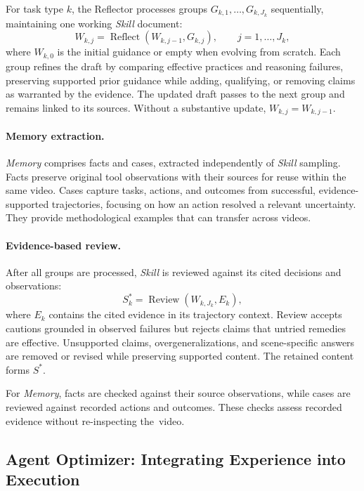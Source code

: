 \documentclass{article} %
\begin{document}
For task type $k$, the Reflector processes groups $G_{k,1},\ldots,G_{k,J_k}$ sequentially, maintaining one working \textit{Skill} document:
\begin{equation}
W_{k,j}=\operatorname{Reflect}(W_{k,j-1},G_{k,j}),
\qquad j=1,\ldots,J_k,
\end{equation}
where $W_{k,0}$ is the initial guidance or empty when evolving from scratch. Each group refines the draft by comparing effective practices and reasoning failures, preserving supported prior guidance while adding, qualifying, or removing claims as warranted by the evidence. The updated draft passes to the next group and remains linked to its sources. Without a substantive update, $W_{k,j}=W_{k,j-1}$.

\paragraph{Memory extraction.}
\textit{Memory} comprises facts and cases, extracted independently of \textit{Skill} sampling. Facts preserve original tool observations with their sources for reuse within the same video. Cases capture tasks, actions, and outcomes from successful, evidence-supported trajectories, focusing on how an action resolved a relevant uncertainty. They provide methodological examples that can transfer across videos.

\paragraph{Evidence-based review.}
After all groups are processed, \textit{Skill} is reviewed against its cited decisions and observations:
\begin{equation}
S_k^*=\operatorname{Review}(W_{k,J_k},E_k),
\end{equation}
where $E_k$ contains the cited evidence in its trajectory context. Review accepts cautions grounded in observed failures but rejects claims that untried remedies are effective. Unsupported claims, overgeneralizations, and scene-specific answers are removed or revised while preserving supported content. The retained content forms $S^*$.

For \textit{Memory}, facts are checked against their source observations, while cases are reviewed against recorded actions and outcomes. These checks assess recorded evidence without re-inspecting the~video.

\subsection{Agent Optimizer: Integrating Experience into Execution}
\label{sec:optimizer}
\end{document}
